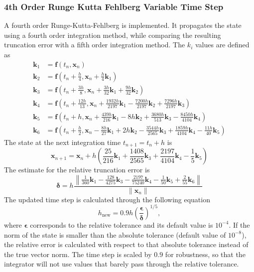 \subsubsection{4th Order Runge Kutta Fehlberg Variable Time Step}
A fourth order Runge-Kutta-Fehlberg is implemented. It propagates the state using a fourth order integration method, while comparing the resulting truncation error with a fifth order integration method. The $k_i$ values are defined as
\begin{align}
	\bm k_1 &= \bm f\left(t_{n}, \bm x_{n}\right) \label{eq:k1_RKF45}\\
	\bm k_2 &= \bm f\left(t_{n} + \frac{h}{4}, \bm x_{n} + \frac{h}{4} \bm k_1\right) \\
	\bm k_3 &= \bm f\left(t_{n} + \frac{3h}{8}, \bm x_{n} + \frac{3h}{32} \bm k_1 + \frac{9h}{32} \bm k_2\right) \\
	\bm k_4 &= \bm f\left(t_{n} + \frac{12h}{13}, \bm x_{n} + \frac{1932h}{2197} \bm k_1 - \frac{7200h}{2197} \bm k_2 + \frac{7296h}{2197} \bm k_3\right) \\
	\bm k_5 &= \bm f\left(t_{n} + h, \bm x_{n} + \frac{439h}{216} \bm k_1 - 8h \bm k_2 + \frac{3680h}{513} \bm k_3 - \frac{8450h}{4104} \bm k_4\right) \\
	\bm k_6 &= \bm f\left(t_{n} + \frac{h}{2}, \bm x_{n} - \frac{8h}{27} \bm k_1 + 2h \bm k_2 - \frac{3544h}{2565} \bm k_3 + \frac{1859h}{4104} \bm k_4 - \frac{11h}{40} \bm k_5\right) \label{eq:k6_RKF45}
\end{align}
The state at the next integration time $t_{n+1} = t_{n} + h$ is
\begin{equation}
	\bm x_{n+1} = \bm x_{n} + h \left(
		\frac{25}{216} \bm k_{1} + \frac{1408}{2565} \bm k_{3} + \frac{2197}{4104} \bm k_{4} - \frac{1}{5} \bm k_{5} \label{eq:PropagateState_RKF45}
	\right)
\end{equation}
The estimate for the relative truncation error is
\begin{equation}
	\bm \delta = h\frac{\left\|
		\frac{1}{360} \bm k_{1} - \frac{128}{4275} \bm k_{3} - \frac{2197}{75240} \bm k_{4} - \frac{1}{50} \bm k_{5} + \frac{2}{55} \bm k_{6} \label{eq:Error_RKF45}
	\right\|}{\|\bm x_n\|}
\end{equation}
The updated time step is calculated through the following equation
\begin{equation}
	h_{\text{new}}=0.9h\left(\frac{\bm \epsilon}{\bm \delta}\right)^{1/5}, \label{eq:h_RKF45}
\end{equation}
where $\bm \epsilon$ corresponds to the relative tolerance and its default value is $10^{-4}$. If the norm of the state is smaller than the absolute tolerance (default value of $10^{-8}$), the relative error is calculated with respect to that absolute tolerance instead of the true vector norm. The time step is scaled by $0.9$ for robustness, so that the integrator will not use values that barely pass through the relative tolerance.\\
